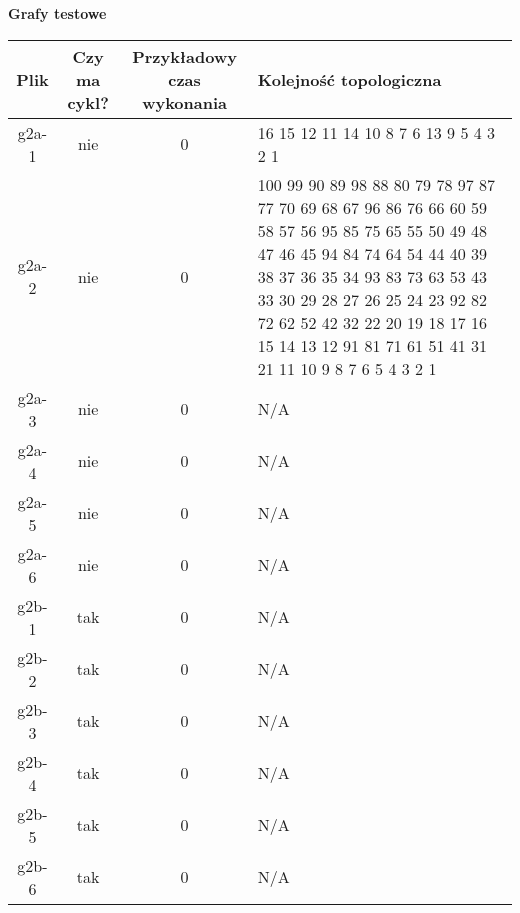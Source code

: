 \documentclass[15pt, a4paper]{article}
\begin{document}
\begin{center}
    \textbf{Grafy testowe}
\end{center}

\begin{table}[ht]
    \begin{tabular}{|c|c|c|p{10cm}|}
        \hline
        Plik & Czy ma cykl? & Przykładowy czas wykonania & Kolejność topologiczna \\ \hline
        g2a-1 & nie & 0 & 16 15 12 11 14 10 8 7 6 13 9 5 4 3 2 1 \\ \hline
        g2a-2 & nie & 0 & 100 99 90 89 98 88 80 79 78 97 87 77 70 69 68 67 96 86 76 66 60 59 58 57 56 95 85 75 65 55 50 49 48 47 46 45 94 84 74 64 54 44 40 39 38 37 36 35 34 93 83 73 63 53 43 33 30 29 28 27 26 25 24 23 92 82 72 62 52 42 32 22 20 19 18 17 16 15 14 13 12 91 81 71 61 51 41 31 21 11 10 9 8 7 6 5 4 3 2 1 \\ \hline
        g2a-3 & nie & 0 & N/A \\ \hline
        g2a-4 & nie & 0 & N/A \\ \hline
        g2a-5 & nie & 0 & N/A \\ \hline
        g2a-6 & nie & 0 & N/A \\ \hline
        g2b-1 & tak & 0 & N/A \\ \hline
        g2b-2 & tak & 0 & N/A \\ \hline
        g2b-3 & tak & 0 & N/A \\ \hline
        g2b-4 & tak & 0 & N/A \\ \hline
        g2b-5 & tak & 0 & N/A \\ \hline
        g2b-6 & tak & 0 & N/A \\ \hline
    \end{tabular}
    \label{tab:grafy testowe 1}
\end{table}
\end{document}
